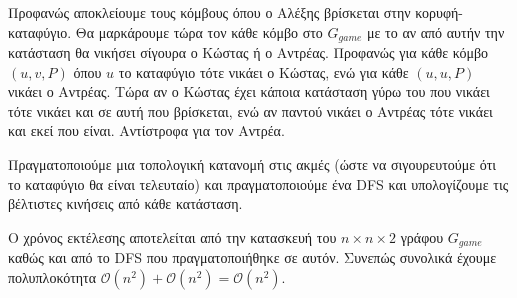 \documentclass[a4paper,11pt]{article}
\begin{document}
Προφανώς αποκλείουμε τους κόμβους όπου ο Αλέξης βρίσκεται στην κορυφή-καταφύγιο. Θα μαρκάρουμε τώρα τον κάθε κόμβο στο $G_{game}$ με το αν από αυτήν την κατάσταση θα νικήσει σίγουρα ο Κώστας ή ο Αντρέας. Προφανώς για κάθε κόμβο $(u, v, P)$ όπου $u$ το καταφύγιο τότε νικάει ο Κώστας, ενώ για κάθε $(u, u, P)$ νικάει ο Αντρέας. Τώρα αν ο Κώστας έχει κάποια κατάσταση γύρω του που νικάει τότε νικάει και σε αυτή που βρίσκεται, ενώ αν παντού νικάει ο Αντρέας τότε νικάει και εκεί που είναι. Αντίστροφα για τον Αντρέα.

Πραγματοποιούμε μια τοπολογική κατανομή στις ακμές (ώστε να σιγουρευτούμε ότι το καταφύγιο θα είναι τελευταίο) και πραγματοποιούμε ένα DFS και υπολογίζουμε τις βέλτιστες κινήσεις από κάθε κατάσταση.

Ο χρόνος εκτέλεσης αποτελείται από την κατασκευή του $n \times n \times 2$ γράφου $G_{game}$ καθώς και από το DFS που πραγματοποιήθηκε σε αυτόν. Συνεπώς συνολικά έχουμε πολυπλοκότητα $\mathcal{O}(n^2) + \mathcal{O}(n^2) = \mathcal{O}(n^2)$.
\end{document}
